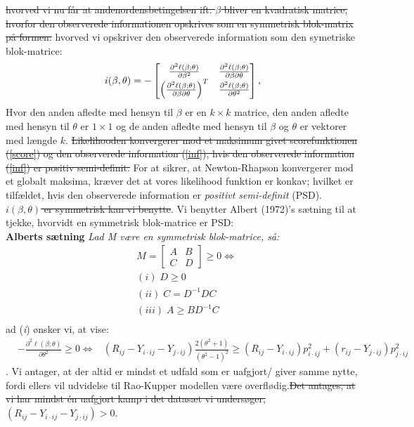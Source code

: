 \documentclass[11pt,a4paper]{article}
\begin{document}
\sout{hvorved vi nu får at andenordensbetingelsen ift. $\beta$ bliver en kvadratisk matrice, hvorfor den observerede informationen opskrives som en symmetrisk blok-matrix på formen:}
hvorved vi opskriver den observerede information som den symetriske blok-matrice:
\begin{align*}
i(\beta,\theta) = -\begin{bmatrix}
\frac{\partial^2 \ell(\beta;\theta)}{\partial \beta^2} &\frac{\partial^2 \ell(\beta;\theta)}{\partial \beta \partial \theta} \\
\Big{(}\frac{\partial^2 \ell(\beta;\theta)}{\partial \beta \partial \theta}\Big{)}^T & \frac{\partial^2 \ell(\beta;\theta)}{\partial \theta^2}
\end{bmatrix},
\label{inf}
\end{align*}
Hvor den anden afledte med hensyn til $\beta$ er en $k\times k$ matrice, den anden afledte med hensyn til $\theta$ er $1 \times 1$ og de anden afledte med hensyn til $\beta$ og $\theta$ er vektorer med længde $k$. 
\sout{Likelihooden konvergerer mod et maksimum givet scorefunktionen (\ref{score}) og den observerede information (\ref{inf}), hvis den observerede information (\ref{inf}) er positiv semi-definit.} For at sikrer, at Newton-Rhapson konvergerer mod et globalt maksima, kræver det at vores likelihood funktion er konkav; hvilket er tilfældet, hvis den observerede information er \textit{positivt semi-definit} (PSD). \sout{$i(\beta,\theta)$ er symmetrisk kan vi benytte}. Vi benytter Albert (1972)\cite{Albert}'s sætning til at tjekke, hvorvidt en symmetrisk blok-matrice er PSD:  \\\textbf{ Alberts sætning} \textit{Lad M være en symmetrisk blok-matrice, så:}
\begin{align*}
&M = \begin{bmatrix}
A & B\\
C & D
\end{bmatrix}\geq 0 \iff \\
&(i)\; D\geq0\\
&(ii)\; C=D^{-1}DC\\
&(iii)\; A\geq BD^{-1}C\\
\end{align*}  
ad (\textit{i}) ønsker vi, at vise: 
\begin{align*}
&-\frac{\partial^2 \ell(\beta;\theta)}{\partial \theta^2} \geq 0 \iff &(R_{ij}- Y_{i\cdot ij}-Y_{j\cdot ij}) \frac{2(\theta^2+1)}{(\theta^2-1)^2} \geq (R_{ij}-Y_{i\cdot ij})p_{i\cdot ij}^2 + (r_{ij}-Y_{j\cdot ij})p_{j\cdot ij}^2
\end{align*}. Vi antager, at der altid er mindst et udfald som er uafgjort/ giver samme nytte, fordi ellers vil udvidelse til Rao-Kupper modellen være overflødig.\sout{Det antages, at vi har mindst én uafgjort kamp i det datasæt vi undersøger, }$(R_{ij}- Y_{i\cdot ij}-Y_{j\cdot ij}) > 0$.
\end{document}
